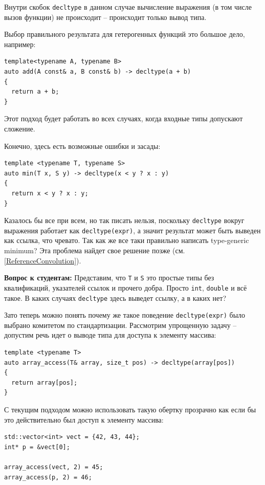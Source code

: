 \documentclass[a4paper,12pt,oneside]{article}
\newif\ifanswers
\begin{document}
Внутри скобок \lstinline!decltype! в данном случае вычисление выражения (в том числе вызов функции) не происходит -- происходит только вывод типа.

Выбор правильного результата для гетерогенных функций это большое дело, например:

\begin{lstlisting}
template<typename A, typename B> 
auto add(A const& a, B const& b) -> decltype(a + b) 
{ 
  return a + b; 
}
\end{lstlisting}

Этот подход будет работать во всех случаях, когда входные типы допускают сложение.

Конечно, здесь есть возможные ошибки и засады:

\begin{lstlisting}
template <typename T, typename S>
auto min(T x, S y) -> decltype(x < y ? x : y) 
{
  return x < y ? x : y;
}
\end{lstlisting}

Казалось бы все при всем, но так писать нельзя, поскольку \lstinline!decltype! вокруг выражения работает как \lstinline!decltype(expr)!, а значит результат может быть выведен как ссылка, что чревато. Так как же все таки правильно написать type-generic minimum? Эта проблема найдет свое решение позже (см. \ref{ReferenceConvolution}).

\textbf{Вопрос к студентам:} Представим, что \lstinline!T! и \lstinline!S! это простые типы без квалификаций, указателей ссылок и прочего добра. Просто  \lstinline!int!, \lstinline!double! и всё такое. В каких случаях  \lstinline!decltype! здесь выведет ссылку, а в каких нет? 

\ifanswers
Правильный ответ: ссылка будет если типы одинаковые. Если они разные, все будет хорошо.
\fi

Зато теперь можно понять почему же такое поведение \lstinline!decltype(expr)! было выбрано комитетом по стандартизации. Рассмотрим упрощенную задачу -- допустим речь идет о выводе типа для доступа к элементу массива:

\begin{lstlisting}
template <typename T>
auto array_access(T& array, size_t pos) -> decltype(array[pos]) 
{
  return array[pos];
}
\end{lstlisting}

С текущим подходом можно использовать такую обертку прозрачно как если бы это действительно был доступ к элементу массива:

\begin{lstlisting}
std::vector<int> vect = {42, 43, 44};
int* p = &vect[0];

array_access(vect, 2) = 45;
array_access(p, 2) = 46;
\end{lstlisting}
\end{document}
